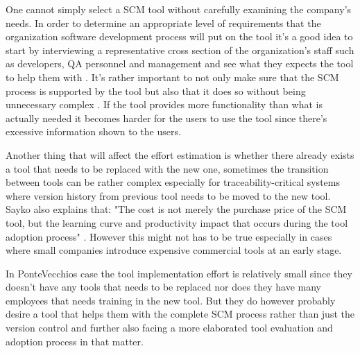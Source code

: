 \documentclass[10pt]{article}
\begin{document}
\noindent One cannot simply select a SCM tool without carefully examining the company's needs. In order to determine an appropriate level of requirements that the organization software development process will put on the tool it's a good idea to start by interviewing a representative cross section of the organization's staff such as developers, QA personnel and management and see what they expects the tool to help them with \cite{Sayko}.
It's rather important to not only make sure that the SCM process is supported by the tool but also that it does so without being unnecessary complex \cite{ABB}. If the tool provides more functionality than what is actually needed it becomes harder for the users to use the tool since there's excessive information shown to the users.

\noindent Another thing that will affect the effort estimation is whether there already exists a tool that needs to be replaced with the new one, sometimes the transition between tools can be rather complex especially for traceability-critical systems where version history from previous tool needs to be moved to the new tool. Sayko also explains that: "The cost is not merely the purchase price of the SCM tool, but the learning curve and productivity impact that occurs during the tool adoption process" \cite{Sayko}. However this might not has to be true especially in cases where small companies introduce expensive commercial tools at an early stage.

\noindent In PonteVecchios case the tool implementation effort is relatively small since they doesn't have any tools that needs to be replaced nor does they have many employees that needs training in the new tool. But they do however probably desire a tool that helps them with the complete SCM process rather than just the version control and further also facing a more elaborated tool evaluation and adoption process in that matter.
\end{document}
